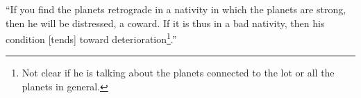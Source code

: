 ``If  you find the planets retrograde in a nativity in which the planets are strong, then he will be distressed, a coward. If it is thus in a bad nativity, then his condition [tends] toward deterioration\footnote{Not clear if he is talking about the planets connected to the lot or all the planets in general.}.''
